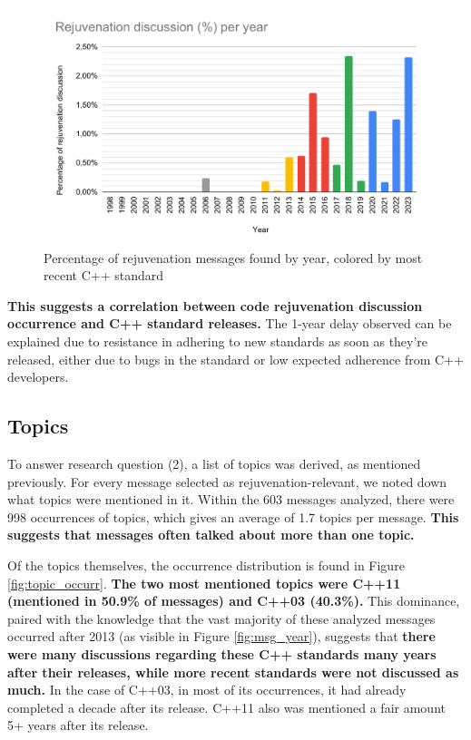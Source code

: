 \begin{figure}[h]
  \centering
  \includegraphics[width=\linewidth]{images/rejuv_proportion_per_year_std.pdf}
  \caption{Percentage of rejuvenation messages found by year, colored by most recent C++ standard}
  \label{fig:std_prop_year}
\end{figure}

\textbf{This suggests a correlation between code rejuvenation discussion occurrence and C++ standard releases.} The 1-year delay observed can be explained due to resistance in adhering to new standards as soon as they're released, either due to bugs in the standard or low expected adherence from C++ developers.




\subsection{Topics}

To answer research question (2), a list of topics was derived, as mentioned previously. For every message selected as rejuvenation-relevant, we noted down what topics were mentioned in it. Within the 603 messages analyzed, there were 998 occurrences of topics, which gives an average of 1.7 topics per message. \textbf{This suggests that messages often talked about more than one topic.}

Of the topics themselves, the occurrence distribution is found in Figure \ref{fig:topic_occurr}. \textbf{The two most mentioned topics were C++11 (mentioned in 50.9\% of messages) and C++03 (40.3\%).} This dominance, paired with the knowledge that the vast majority of these analyzed messages occurred after 2013 (as visible in Figure \ref{fig:msg_year}), suggests that \textbf{there were many discussions regarding these C++ standards many years after their releases, while more recent standards were not discussed as much.} In the case of C++03, in most of its occurrences, it had already completed a decade after its release. C++11 also was mentioned a fair amount 5+ years after its release.

